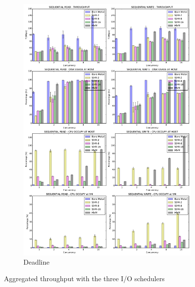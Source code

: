 \documentclass{acmsig}
\begin{document}
\begin{figure}[t]
\begin{subfigure}[b]{0.5\textwidth}
     \includegraphics[width=\textwidth]{figures/deadline.pdf}
     \caption{Deadline}
     \label{fig:aggthroughput_dealine}
   \end{subfigure}
   \caption{Aggregated throughput with the three I/O schedulers}\label{fig:aggthroughput}
\end{figure}
\end{document}
